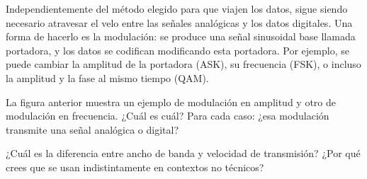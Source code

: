 Independientemente del método elegido para que viajen los datos, sigue siendo necesario atravesar el velo entre las señales analógicas y los datos digitales. 
Una forma de hacerlo es la modulación: se produce una señal sinusoidal base llamada portadora,
y los datos se codifican modificando esta portadora. Por ejemplo, se puede cambiar la amplitud de la portadora (ASK),
su frecuencia (FSK), o incluso la amplitud y la fase al mismo tiempo (QAM). 

\begin{exercise}
La figura anterior muestra un ejemplo de modulación en amplitud y otro de modulación en frecuencia. 
¿Cuál es cuál? Para cada caso: ¿esa modulación transmite una señal analógica o digital?
\end{exercise}


\begin{exercise}
¿Cuál es la diferencia entre ancho de banda y velocidad de transmisión? 
¿Por qué crees que se usan indistintamente en contextos no técnicos?
\end{exercise}
